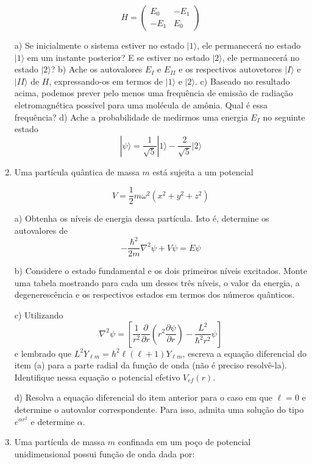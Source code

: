 \begin{enumerate}[start=1,label={\bfseries Q\arabic*.}]
$$
H=\left(\begin{array}{cc}
E_{0} & -E_{1} \\
-E_{1} & E_{0}
\end{array}\right)
$$


a) Se inicialmente o sistema estiver no estado $|1\rangle$, ele permanecerá no estado $|1\rangle$ em um instante posterior? E se estiver no estado $|2\rangle$, ele permanecerá no estado $|2 \rangle$?
b) Ache os autovalores $E_{I}$ e $E_{II}$ e os respectivos autovetores $|I\rangle$ e $|II\rangle$ de $H$, expressando-os em termos de $|1\rangle$ e $|2\rangle$.
c) Baseado no resultado acima, podemos prever pelo menos uma frequência de emissão de radiação eletromagnética possível para uma molécula de amônia. Qual é essa frequência?
d) Ache a probabilidade de medirmos uma energia $E_{I}$ no seguinte estado
$$
|\psi\rangle=\frac{1}{\sqrt{5}}|1\rangle-\frac{2}{\sqrt{5}}|2\rangle
$$



\item Uma partícula quântica de massa $m$ está sujeita a um potencial

$$
V=\frac{1}{2} m \omega^{2}\left(x^{2}+y^{2}+z^{2}\right)
$$


  a) Obtenha os níveis de energia dessa partícula. Isto é, determine os autovalores de
  $$
  -\frac{\hbar^{2}}{2 m} \nabla^{2} \psi+V \psi=E \psi
  $$

  b) Considere o estado fundamental e os dois primeiros níveis excitados. Monte uma tabela mostrando para cada um desses três níveis, o valor da energia, a degenerescência e os respectivos estados em termos dos números quânticos.

  c) Utilizando
  $$
  \nabla^{2} \psi=\left[\frac{1}{r^{2}} \frac{\partial}{\partial r}\left(r^{2} \frac{\partial \psi}{\partial r}\right)-\frac{L^{2}}{\hbar^{2} r^{2}} \psi\right]
  $$
  e lembrado que $L^{2} Y_{\ell m}=\hbar^{2} \ell(\ell+1) Y_{\ell m}$, escreva a equação diferencial do item (a) para a parte radial da função de onda (não é preciso resolvê-la). Identifique nessa equação o potencial efetivo $V_{ef}(r)$.

  d) Resolva a equação diferencial do item anterior para o caso em que $\ell = 0$ e determine o autovalor correspondente. Para isso, admita uma solução do tipo $e^{\alpha r^{2}}$ e determine $\alpha$.




\item Uma partícula de massa $m$ confinada em um poço de potencial unidimensional possui função de onda dada por:


\end{enumerate}
